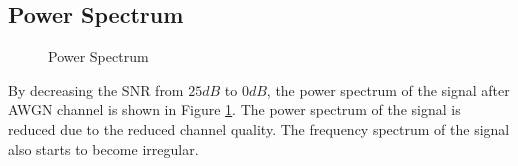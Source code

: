 \documentclass[11pt]{article}
\numberwithin{figure}{section}
\numberwithin{equation}{section}
\begin{document}
\subsection{Power Spectrum}
\begin{figure}[!h]
    \centering
    \caption{Power Spectrum}
    \label{fig:Power Spectrum}
\end{figure}
By decreasing the SNR from $25dB$ to $0dB$, the power spectrum of the signal after AWGN channel is shown in Figure \ref{fig:Power Spectrum}. The power spectrum of the signal is reduced due to the reduced channel quality. The frequency spectrum of the signal also starts to become irregular.
\end{document}
